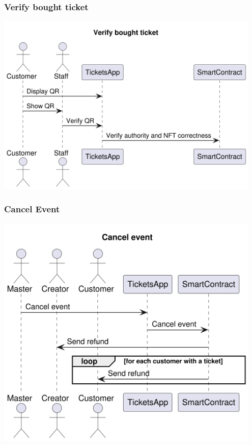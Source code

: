 \documentclass[11pt]{article}
\begin{document}
\subsubsection{Verify bought ticket}
\label{sec:orgd59a908}

\begin{center}
\includegraphics[width=0.95\textwidth]{./img/verify-bought-ticket.png}
\label{org9982c1b}
\end{center}
\subsubsection{Cancel Event}
\label{sec:org668879d}

\begin{center}
\includegraphics[width=0.95\textwidth]{./img/cancel-event.png}
\label{org67893fe}
\end{center}
\end{document}
